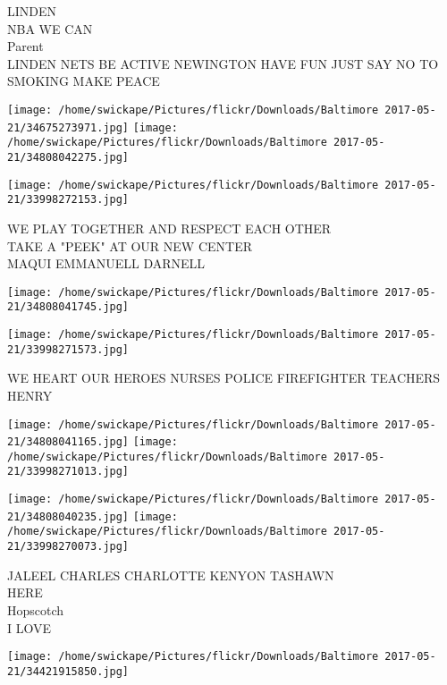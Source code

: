 \documentclass[10pt,letterpaper]{article}
\begin{document}
LINDEN\\
NBA WE CAN\\
Parent\\
LINDEN NETS BE ACTIVE NEWINGTON HAVE FUN JUST SAY NO TO SMOKING MAKE PEACE\\
\pagebreak

\texttt{[image: /home/swickape/Pictures/flickr/Downloads/Baltimore 2017-05-21/34675273971.jpg]}
\texttt{[image: /home/swickape/Pictures/flickr/Downloads/Baltimore 2017-05-21/34808042275.jpg]}

\vspace{0.25in}
\texttt{[image: /home/swickape/Pictures/flickr/Downloads/Baltimore 2017-05-21/33998272153.jpg]}

WE PLAY TOGETHER AND RESPECT EACH OTHER\\
TAKE A "PEEK" AT OUR NEW CENTER\\
MAQUI EMMANUELL DARNELL\\
\pagebreak

\texttt{[image: /home/swickape/Pictures/flickr/Downloads/Baltimore 2017-05-21/34808041745.jpg]}

\vspace{0.25in}
\texttt{[image: /home/swickape/Pictures/flickr/Downloads/Baltimore 2017-05-21/33998271573.jpg]}

WE HEART OUR HEROES NURSES POLICE FIREFIGHTER TEACHERS\\
HENRY\\
\pagebreak

\texttt{[image: /home/swickape/Pictures/flickr/Downloads/Baltimore 2017-05-21/34808041165.jpg]}
\texttt{[image: /home/swickape/Pictures/flickr/Downloads/Baltimore 2017-05-21/33998271013.jpg]}

\texttt{[image: /home/swickape/Pictures/flickr/Downloads/Baltimore 2017-05-21/34808040235.jpg]}
\texttt{[image: /home/swickape/Pictures/flickr/Downloads/Baltimore 2017-05-21/33998270073.jpg]}

JALEEL CHARLES CHARLOTTE KENYON TASHAWN\\
HERE\\
Hopscotch\\
I LOVE\\
\pagebreak

\texttt{[image: /home/swickape/Pictures/flickr/Downloads/Baltimore 2017-05-21/34421915850.jpg]}
\end{document}
